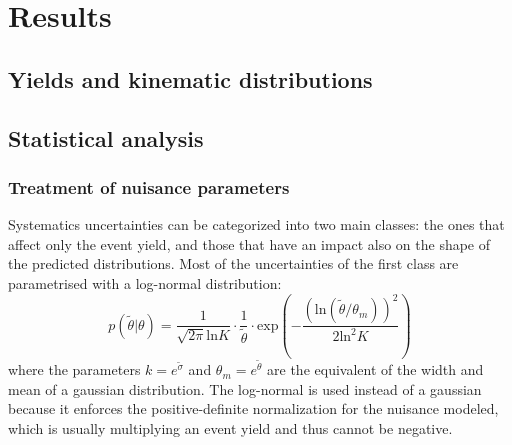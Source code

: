 \chapter{Results}
\section{Yields and kinematic distributions}
\section{Statistical analysis}
\subsection{Treatment of nuisance parameters}
Systematics uncertainties can be categorized into two main classes: the ones that affect only the event yield, and those that have an impact also on the shape of the predicted distributions.
Most of the uncertainties of the first class are parametrised with a log-normal distribution:
\begin{equation}
  \label{eq:lnNdef}
  p(\tilde{\theta}|\theta) = \frac{1}{\sqrt{2 \pi} \text{ln} K} \cdot \frac{1}{\tilde{\theta}} \cdot \text{exp} \left( -\frac{(\text{ln}(\tilde{\theta}/\theta_m))^2}{2 \text{ln}^2 K} \right)
\end{equation}
where the parameters $k = e^{\tilde{\sigma}}$ and $\theta_m = e^{\tilde{\theta}}$ are the equivalent of the width and mean of a gaussian distribution.
The log-normal is used instead of a gaussian because it enforces the positive-definite normalization for the nuisance modeled, which is usually multiplying an event yield and thus cannot be negative.


